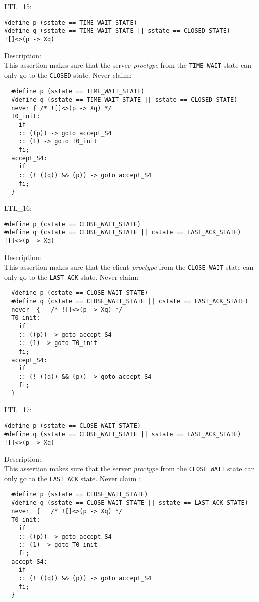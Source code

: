 \documentclass{WigReport} \usepackage{epsfig} %
\begin{document}
LTL\_15:\\
\begin{lstlisting}
#define p (sstate == TIME_WAIT_STATE)
#define q (sstate == TIME_WAIT_STATE || sstate == CLOSED_STATE)
![]<>(p -> Xq)
\end{lstlisting}
Description:\\
This assertion makes sure that the server \textit{proctype} from the
\verb|TIME WAIT| state can only go to the \verb|CLOSED| state.
Never claim:\\
\begin{lstlisting}
  #define p (sstate == TIME_WAIT_STATE)
  #define q (sstate == TIME_WAIT_STATE || sstate == CLOSED_STATE)
  never { /* ![]<>(p -> Xq) */
  T0_init:
    if
    :: ((p)) -> goto accept_S4
    :: (1) -> goto T0_init
    fi;
  accept_S4:
    if
    :: (! ((q)) && (p)) -> goto accept_S4
    fi;
  }
\end{lstlisting}


LTL\_16:\\
\begin{lstlisting}
#define p (cstate == CLOSE_WAIT_STATE)
#define q (cstate == CLOSE_WAIT_STATE || cstate == LAST_ACK_STATE)
![]<>(p -> Xq)
\end{lstlisting}
Description:\\
This assertion makes sure that the client \textit{proctype} from the
\verb|CLOSE WAIT| state can only go to the \verb|LAST ACK| state.
Never claim:\\
\begin{lstlisting}
  #define p (cstate == CLOSE_WAIT_STATE)
  #define q (cstate == CLOSE_WAIT_STATE || cstate == LAST_ACK_STATE)
  never  {   /* ![]<>(p -> Xq) */
  T0_init:
    if
    :: ((p)) -> goto accept_S4
    :: (1) -> goto T0_init
    fi;
  accept_S4:
    if
    :: (! ((q)) && (p)) -> goto accept_S4
    fi;
  }
\end{lstlisting}


LTL\_17:\\
\begin{lstlisting}
#define p (sstate == CLOSE_WAIT_STATE)
#define q (sstate == CLOSE_WAIT_STATE || sstate == LAST_ACK_STATE)
![]<>(p -> Xq)
\end{lstlisting}
Description:\\
This assertion makes sure that the server \textit{proctype} from the
\verb|CLOSE WAIT| state can only go to the \verb|LAST ACK| state.
Never claim :\\
\begin{lstlisting}
  #define p (sstate == CLOSE_WAIT_STATE)
  #define q (sstate == CLOSE_WAIT_STATE || sstate == LAST_ACK_STATE)
  never  {   /* ![]<>(p -> Xq) */
  T0_init:
    if
    :: ((p)) -> goto accept_S4
    :: (1) -> goto T0_init
    fi;
  accept_S4:
    if
    :: (! ((q)) && (p)) -> goto accept_S4
    fi;
  }
\end{lstlisting}
\end{document}

